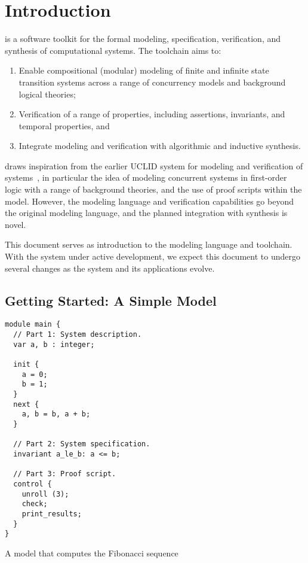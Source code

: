 \chapter{Introduction}

\uclid{} is a software toolkit for the formal modeling, specification,
verification, and synthesis of computational systems. 
The \uclid{} toolchain aims to:
\begin{enumerate}
\item Enable compositional (modular) modeling of finite and infinite state transition systems across a range of concurrency models and background logical theories;
\item Verification of a range of properties, including assertions, invariants, and temporal properties, and %
\item Integrate modeling and verification with algorithmic and inductive synthesis.
\end{enumerate}

\uclid draws inspiration from the earlier {UCLID} system for modeling
and verification of systems~\cite{bryant-cav02,uclid-www}, in particular
the idea of modeling concurrent systems in first-order logic 
with a range of background theories, and the use of proof scripts
within the model. However, the \uclid modeling
language and verification capabilities go beyond the original modeling 
language, and the planned integration with synthesis is novel.

This document serves as introduction to the \uclid{} modeling 
language and toolchain. With the \uclid system under active
development, we expect this document to undergo several changes
as the system and its applications evolve.

\section{Getting Started: A Simple \uclid{} Model}

\begin{uclidlisting}[htbp]
\begin{lstlisting}[language=uclid,style=uclidstyle]
module main {
  // Part 1: System description.
  var a, b : integer;

  init {
    a = 0;
    b = 1;
  }
  next {
    a, b = b, a + b;
  }

  // Part 2: System specification.
  invariant a_le_b: a <= b;

  // Part 3: Proof script.
  control {
    unroll (3);
    check;
    print_results;
  }
}
\end{lstlisting}
\label{ex:fib-model}
\caption{A \uclid{} model that computes the Fibonacci sequence}
\end{uclidlisting}

